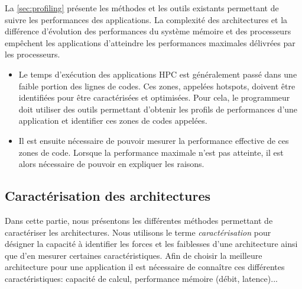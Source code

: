     La \autoref{sec:profiling} présente les méthodes et les outils existants permettant de suivre les performances des applications. La complexité des architectures et la différence d'évolution des performances du système mémoire et des processeurs empêchent les applications d'atteindre les performances maximales délivrées par les processeurs. 
    \begin{itemize}
        \item Le temps d'exécution des applications HPC est généralement passé dans une faible portion des lignes de codes. Ces zones, appelées \glspl{hotspot}, doivent être identifiées pour être caractérisées et optimisées. Pour cela, le programmeur doit utiliser des outils permettant d'obtenir les profils de performances d'une application et identifier ces zones de codes appelées.
        
        \item Il est ensuite nécessaire de pouvoir mesurer la performance effective de ces zones de code. Lorsque la performance maximale n'est pas atteinte, il est alors nécessaire de pouvoir en expliquer les raisons. 
    \end{itemize}
    
      
\subsection{Caractérisation des architectures}\label{sec:caracterisation}
    
    Dans cette partie, nous présentons les différentes méthodes permettant de caractériser les architectures. Nous utilisons le terme \textit{caractérisation} pour désigner la capacité à identifier les forces et les faiblesses d'une architecture ainsi que d'en mesurer certaines caractéristiques. Afin de choisir la meilleure architecture pour une application il est nécessaire de connaître ces différentes caractéristiques: capacité de calcul, performance mémoire (débit, latence)...
    
